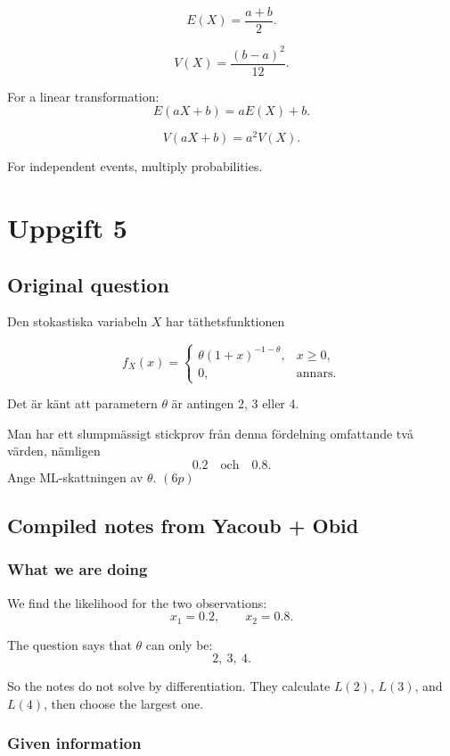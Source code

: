 \documentclass[10pt]{article}
\begin{document}
\[
E(X)=\frac{a+b}{2}.
\]

\[
V(X)=\frac{(b-a)^2}{12}.
\]

For a linear transformation:
\[
E(aX+b)=aE(X)+b.
\]

\[
V(aX+b)=a^2V(X).
\]

For independent events, multiply probabilities.

\section*{Uppgift 5}

\subsection*{Original question}

Den stokastiska variabeln \(X\) har täthetsfunktionen

\[
f_X(x)=
\begin{cases}
\theta(1+x)^{-1-\theta},
& x\ge 0,\\
0,
& \text{annars}.
\end{cases}
\]

Det är känt att parametern \(\theta\) är antingen
2, 3 eller 4.

Man har ett slumpmässigt stickprov från denna
fördelning omfattande två värden, nämligen
\[
0.2
\quad\text{och}\quad
0.8.
\]
Ange ML-skattningen av \(\theta\). \((6p)\)

\subsection*{Compiled notes from Yacoub + Obid}

\subsubsection*{What we are doing}

We find the likelihood for the two observations:
\[
x_1=0.2,
\qquad
x_2=0.8.
\]

The question says that \(\theta\) can only be:
\[
2,\ 3,\ 4.
\]

So the notes do not solve by differentiation.
They calculate \(L(2)\), \(L(3)\), and \(L(4)\),
then choose the largest one.

\subsubsection*{Given information}
\end{document}
